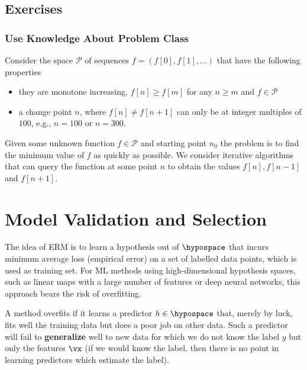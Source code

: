 \documentclass[12pt]{report}
\begin{document}
\section{Exercises}

\subsection{Use Knowledge About Problem Class} 
Consider the space $\mathcal{P}$ of sequences $f = (f[0],f[1],\ldots)$ that have the following properties 
\begin{itemize} 
	\item they are monotone increasing, $f[n] \geq f[m]$ for any $n \geq m$ and $f \in \mathcal{P}$
	\item a change point $n$, where $f[n] \neq f[n+1]$ can only be at integer multiples of $100$, 
	e.g., $n=100$ or $n=300$. 
\end{itemize} 
Given some unknown function $f \in \mathcal{P}$ and starting point $n_{0}$ the problem is to find 
the minimum value of $f$ as quickly as possible. We consider iterative algorithms that can query
the function at some point $n$ to obtain the values $f[n], f[n-1]$ and $f[n+1]$. 


\newpage
\chapter{Model Validation and Selection} 
\label{ch_validation_selection}
The idea of ERM is to learn a hypothesis out of $\hypospace$ that incurs 
minimum average loss (empirical error) on a set of labelled data points, 
which is used as training set. For ML methods using high-dimensional 
hypothesis spaces, such as linear maps with a large number of features 
or deep neural networks, this approach bears the risk of overfitting. 

A method overfits if it learns a predictor $h \in \hypospace$ that, 
merely by luck, fits well the training data but does a poor job on 
other data. Such a predictor will fail to {\bf generalize} well to new 
data for which we do not know the label $y$ but only the features 
$\vx$ (if we would know the label, then there is no point in learning 
predictors which estimate the label). 
\end{document}
